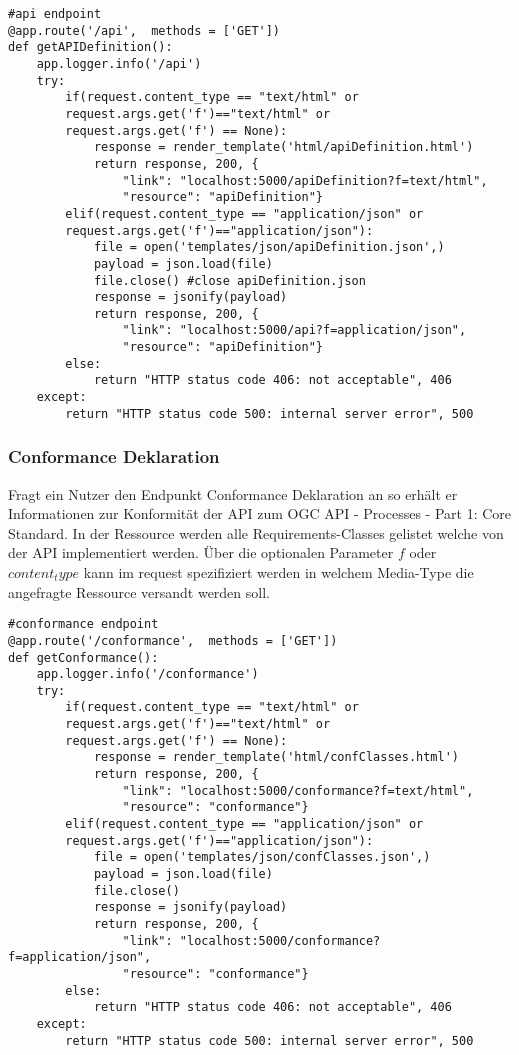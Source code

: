 \begin{lstlisting}[caption={API Definition Endpoint}, style = Python]
#api endpoint
@app.route('/api',  methods = ['GET']) 
def getAPIDefinition():
    app.logger.info('/api') 
    try:
        if(request.content_type == "text/html" or
        request.args.get('f')=="text/html" or 
        request.args.get('f') == None): 
            response = render_template('html/apiDefinition.html') 
            return response, 200, {
                "link": "localhost:5000/apiDefinition?f=text/html", 
                "resource": "apiDefinition"} 
        elif(request.content_type == "application/json" or 
        request.args.get('f')=="application/json"): 
            file = open('templates/json/apiDefinition.json',) 
            payload = json.load(file) 
            file.close() #close apiDefinition.json
            response = jsonify(payload) 
            return response, 200, {
                "link": "localhost:5000/api?f=application/json", 
                "resource": "apiDefinition"} 
        else:
            return "HTTP status code 406: not acceptable", 406 
    except:
        return "HTTP status code 500: internal server error", 500
\end{lstlisting}

\subsubsection{Conformance Deklaration}
Fragt ein Nutzer den Endpunkt Conformance Deklaration an so erhält er Informationen zur Konformität der API zum OGC API - Processes - Part 1: Core Standard. 
In der Ressource werden alle Requirements-Classes gelistet welche von der API implementiert werden. Über die optionalen Parameter $f$ oder $content_type$ kann
im request spezifiziert werden in welchem Media-Type die angefragte Ressource versandt werden soll.

\begin{lstlisting}[caption={Conformance Endpoint}, style = Python]
#conformance endpoint
@app.route('/conformance',  methods = ['GET'])
def getConformance():
    app.logger.info('/conformance') 
    try:
        if(request.content_type == "text/html" or 
        request.args.get('f')=="text/html" or 
        request.args.get('f') == None): 
            response = render_template('html/confClasses.html') 
            return response, 200, {
                "link": "localhost:5000/conformance?f=text/html", 
                "resource": "conformance"}
        elif(request.content_type == "application/json" or 
        request.args.get('f')=="application/json"): 
            file = open('templates/json/confClasses.json',)
            payload = json.load(file) 
            file.close() 
            response = jsonify(payload) 
            return response, 200, {
                "link": "localhost:5000/conformance?f=application/json",
                "resource": "conformance"} 
        else:
            return "HTTP status code 406: not acceptable", 406 
    except:
        return "HTTP status code 500: internal server error", 500
\end{lstlisting}   
